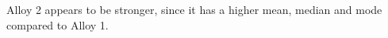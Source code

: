 \documentclass[letterpaper]{article}
\begin{document}


Alloy 2 appears to be stronger, since it has a higher mean, median and mode
compared to Alloy 1.

\subsection{}%
%
%
\end{document}
